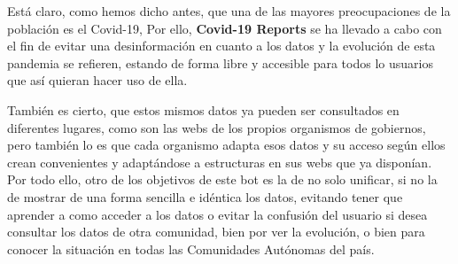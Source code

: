 Está claro, como hemos dicho antes, que una de las mayores preocupaciones de la población es el Covid-19, Por ello, \textbf{Covid-19 Reports} se ha llevado a cabo con el fin de evitar una desinformación en cuanto a los datos y la evolución de esta pandemia se refieren, estando de forma libre y accesible para todos lo usuarios que así quieran hacer uso de ella.

También es cierto, que estos mismos datos ya pueden ser consultados en diferentes lugares, como son las webs de los propios organismos de gobiernos, pero también lo es que cada organismo adapta esos datos y su acceso según ellos crean convenientes y adaptándose a estructuras en sus webs que ya disponían. Por todo ello, otro de los objetivos de este bot es la de no solo unificar, si no la de mostrar de una forma sencilla e idéntica los datos, evitando tener que aprender a como acceder a los datos o evitar la confusión del usuario si desea consultar los datos de otra comunidad, bien por ver la evolución, o bien para conocer la situación en todas las Comunidades Autónomas del país.